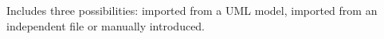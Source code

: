 \begin{table}[ht]
\begin{threeparttable}
\begin{tabular}{@{}lccc@{}}
\end{tabular}
\begin{tablenotes}
    \small
    \item * Includes three possibilities: imported from a UML model, imported from an independent file or manually introduced.
\end{tablenotes}
\end{threeparttable} 
\end{table}